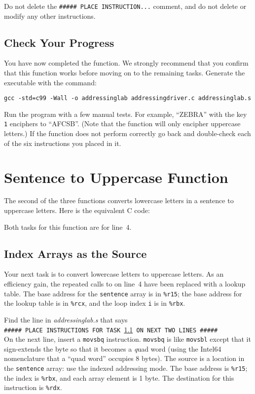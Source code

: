 
Do not delete the \texttt{\#\#\#\#\# PLACE INSTRUCTION...} comment, and do not
delete or modify any other instructions.

\subsection*{Check Your Progress}

You have now completed the  function. We strongly
recommend that you confirm that this function works before moving on to the
remaining tasks. Generate the executable with the command:

\texttt{gcc -std=c99 -Wall -o addressinglab addressingdriver.c addressinglab.s}

Run the program with a few manual tests. For example, ``ZEBRA'' with the key
\texttt{1} enciphers to ``AFCSB''. (Note that the 
function will only encipher uppercase letters.) If the function does not
perform correctly go back and double-check each of the six instructions you
placed in it.


\section{Sentence to Uppercase Function}

The second of the three functions converts lowercase letters in a sentence
to uppercase letters. Here is the equivalent C code:



Both tasks for this function are for line~4.

\subsection{Index Arrays as the Source}\label{task6}

Your next task is to convert lowercase letters to uppercase letters. As an
efficiency gain, the repeated calls to  on line~4 have been
replaced with a lookup table. The base address for the \lstinline{sentence}
array is in \lstinline{%r15}; the base address for the lookup table is in
\lstinline{%rcx}, and the loop index \lstinline{i} is in \lstinline{%rbx}.

Find the line in \textit{addressinglab.s} that says \\
\texttt{\#\#\#\#\# PLACE INSTRUCTIONS FOR TASK \ref{task6} ON NEXT TWO LINES \#\#\#\#\#} \\
On the next line, insert a \lstinline{movsbq} instruction. \lstinline{movsbq}
is like \lstinline{movsbl} except that it sign-extends the byte so that it
becomes a \textit{q}uad word (using the Intel64 nomenclature that a ``quad
word'' occupies 8 bytes). The source is a location in the \lstinline{sentence}
array: use the indexed addressing mode. The base address is \lstinline{%r15};
the index is \lstinline{%rbx}, and each array element is 1 byte. The
destination for this instruction is \lstinline{%rdx}.

